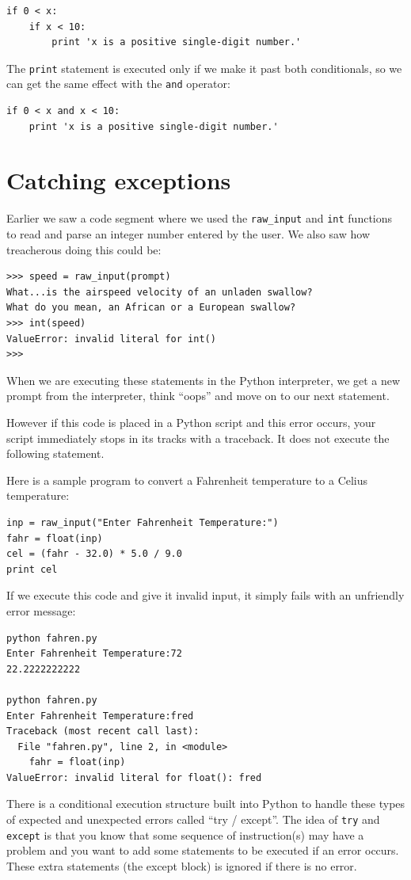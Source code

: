 \documentclass[10pt]{book}
\begin{document}
\beforeverb
\begin{verbatim}
if 0 < x:
    if x < 10:
        print 'x is a positive single-digit number.'
\end{verbatim}
\afterverb
%
The {\tt print} statement is executed only if we make it past both
conditionals, so we can get the same effect with the {\tt and} operator:

\beforeverb
\begin{verbatim}
if 0 < x and x < 10:
    print 'x is a positive single-digit number.'
\end{verbatim}
\afterverb


\section{Catching exceptions}
\label{catch1}

Earlier we saw a code segment where we used the \verb"raw_input" and
{\tt int} functions to read and parse an integer number entered by
the user.  We also saw how treacherous doing this could be:

\beforeverb
\begin{verbatim}
>>> speed = raw_input(prompt)
What...is the airspeed velocity of an unladen swallow?
What do you mean, an African or a European swallow?
>>> int(speed)
ValueError: invalid literal for int()
>>>
\end{verbatim}
\afterverb
%
When we are executing these statements in the Python interpreter, 
we get a new prompt from the interpreter, think ``oops'' and move 
on to our next statement.  

However if this code is placed in a 
Python script and this error occurs, your script immediately 
stops in its tracks with a traceback.  
It does not execute the following statement. 

Here is a sample program to convert a Fahrenheit temperature 
to a Celius temperature:

\beforeverb
\begin{verbatim}
inp = raw_input("Enter Fahrenheit Temperature:")
fahr = float(inp)
cel = (fahr - 32.0) * 5.0 / 9.0
print cel
\end{verbatim}
\afterverb
%
If we execute this code and give it invalid input, it simply fails
with an unfriendly error message:

\beforeverb
\begin{verbatim}
python fahren.py 
Enter Fahrenheit Temperature:72
22.2222222222

python fahren.py 
Enter Fahrenheit Temperature:fred
Traceback (most recent call last):
  File "fahren.py", line 2, in <module>
    fahr = float(inp)
ValueError: invalid literal for float(): fred
\end{verbatim}
\afterverb
%
There is a conditional execution structure built into 
Python to handle these types of expected and unexpected
errors called ``try / except''.  The idea of {\tt try}
and {\tt except} is that you know that some sequence
of instruction(s) may have a problem and you want to 
add some statements to be executed if an error occurs.
These extra statements (the except block) is ignored
if there is no error.
\end{document}
